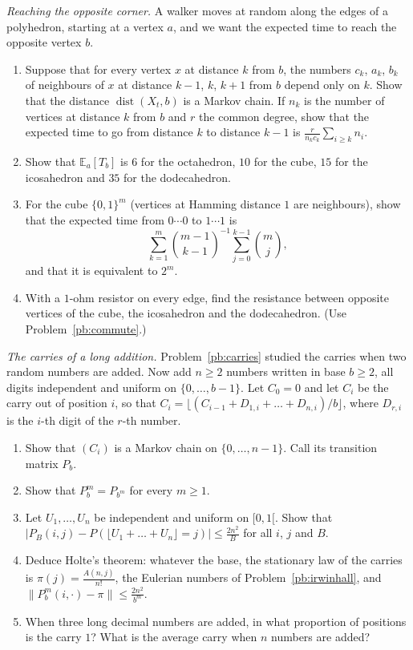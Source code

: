 \begin{exercise}[$\star\star$]\label{pb:antipode}
\emph{Reaching the opposite corner.} A walker moves at random along the edges of a polyhedron, starting at a vertex $a$, and we want
the expected time to reach the opposite vertex $b$.
\begin{enumerate}[label=(\alph*)]
\item Suppose that for every vertex $x$ at distance $k$ from $b$, the numbers $c_k$, $a_k$, $b_k$ of neighbours of $x$ at distance $k-1$, $k$, $k+1$ from
$b$ depend only on $k$. Show that the distance $\operatorname{dist}(X_t,b)$ is a Markov chain. If $n_k$ is the number of vertices at distance $k$ from $b$ and $r$ the common
degree, show that the expected time to go from distance $k$ to distance $k-1$ is $\frac r{n_kc_k}\sum_{i\ge k}n_i$.
\item Show that $\mathbb E_a[T_b]$ is $6$ for the octahedron, $10$ for the cube, $15$ for the icosahedron and $35$ for the dodecahedron.
\item For the cube $\{0,1\}^m$ (vertices at Hamming distance $1$ are neighbours), show that the expected time from $0\cdots0$ to $1\cdots1$ is
\[
\sum_{k=1}^m\binom{m-1}{k-1}^{-1}\sum_{j=0}^{k-1}\binom mj,
\]
and that it is equivalent to $2^m$.
\item With a $1$-ohm resistor on every edge, find the resistance between opposite vertices of the cube, the icosahedron and the
dodecahedron. (Use Problem~\ref{pb:commute}.)
\end{enumerate}
\end{exercise}

\begin{exercise}[$\star\star\star$]\label{pb:holte}
\emph{The carries of a long addition.} Problem~\ref{pb:carries} studied the carries when two random numbers are added. Now add $n\ge2$
numbers written in base $b\ge2$, all digits independent and uniform on $\{0,\dots,b-1\}$. Let $C_0=0$ and let $C_i$ be the carry out of position
$i$, so that $C_i=\lfloor(C_{i-1}+D_{1,i}+\dots+D_{n,i})/b\rfloor$, where $D_{r,i}$ is the $i$-th digit of the $r$-th number.
\begin{enumerate}[label=(\alph*)]
\item Show that $(C_i)$ is a Markov chain on $\{0,\dots,n-1\}$. Call its transition matrix $P_b$.
\item Show that $P_b^m=P_{b^m}$ for every $m\ge1$.
\item Let $U_1,\dots,U_n$ be independent and uniform on $[0,1[$. Show that $|P_B(i,j)-P(\lfloor U_1+\dots+U_n\rfloor=j)|\le\frac{2n^2}B$ for all $i$, $j$ and $B$.
\item Deduce Holte's theorem: whatever the base, the stationary law of the carries is $\pi(j)=\frac{A(n,j)}{n!}$, the Eulerian numbers of
Problem~\ref{pb:irwinhall}, and $\|P_b^m(i,\cdot)-\pi\|\le\frac{2n^2}{b^m}$.
\item When three long decimal numbers are added, in what proportion of positions is the carry $1$? What is the average carry when $n$
numbers are added?
\end{enumerate}
\end{exercise}

